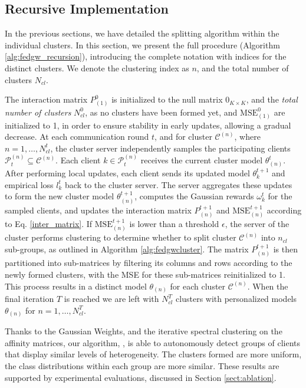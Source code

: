 \subsection{Recursive Implementation}\label{sec:alg_fedgw} 
In the previous sections, we have detailed the splitting algorithm within the individual clusters.  In this section, we present the full \shortname procedure (Algorithm \ref{alg:fedgw_recursion}), introducing the complete notation with indices for the distinct clusters. We denote the clustering index as $n$, and the total number of clusters $N_{cl}$.

The interaction matrix $P^0_{(1)}$ is initialized to the null matrix $0_{K \times K}$, and the \textit{total number of clusters} $N_{cl}^0$, as no clusters have been formed yet, and $\textrm{MSE}_{(1)}^0$ are initialized to 1, in order to ensure stability in early updates, allowing a gradual decrease.  At each communication round $t$, and for cluster $\mathcal{C}^{(n)}$, where $n = 1, \dots, N_{cl}^t$, the cluster server independently samples the participating clients $\mathcal{P}_t^{(n)} \subseteq \mathcal{C}^{(n)}$. Each client $k \in \mathcal{P}_t^{(n)}$ receives the current cluster model $\theta_{(n)}^t$. After performing local updates, each client sends its updated model $\theta_k^{t+1}$ and empirical loss $l_k^t$ back to the cluster server. The server aggregates these updates to form the new cluster model $\theta_{(n)}^{t+1}$, computes the Gaussian rewards $\omega_k^t$ for the sampled clients, and updates the interaction matrix $P_{(n)}^{t+1}$ and $\textrm{MSE}_{(n)}^{t+1}$ according to Eq. \ref{inter_matrix}. If $\textrm{MSE}_{(n)}^{t+1}$ is lower than a threshold $\epsilon$, the server of the cluster performs clustering to determine whether to split cluster $\mathcal{C}^{(n)}$ into $n_{cl}$ sub-groups, as outlined in Algorithm \ref{alg:fedgwcluster}. The matrix $P_{(n)}^{t+1}$ is then partitioned into sub-matrices by filtering its columns and rows according to the newly formed clusters, with the MSE for these sub-matrices reinitialized to 1. This process results in a distinct model $\theta_{(n)}$ for each cluster $\mathcal{C}^{(n)}$. When the final iteration $T$ is reached we are left with $N_{cl}^T$ clusters with personalized models $\theta_{(n)}$ for $n = 1,\dots, N_{cl}^T$.

Thanks to the Gaussian Weights, and the iterative spectral clustering on the affinity matrices, our algorithm, \shortname, is able to autonomously detect groups of clients that display similar levels of heterogeneity.
The clusters formed are more uniform, \ie the class distributions within each group are more similar. These results are supported by experimental evaluations, discussed in Section \ref{sect:ablation}.
